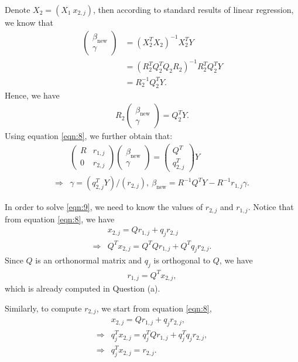 \documentclass[12pt]{article}
\newcommand{\bet}{\beta}
\newcommand{\betln}[1]{\bet_{#1}}
\begin{document}
Denote $X_2 = (X_1~x_{2,j} )$, then according to standard results of linear regression, we know that
 \begin{align*}
 	 \left( \begin{array}{cc}  \betln{\text{new}} \\
 		\gamma \end{array} \right) &= (X_2^TX_2)^{-1}X_2^TY\\
 		& = (R_2^TQ_2^TQ_2R_2)^{-1}R_2^TQ_2^TY\\
 		& = R_2^{-1}Q_2^TY.
 \end{align*}
 Hence, we have
 \begin{align*}
 	R_2 \left( \begin{array}{cc}  \betln{\text{new}} \\
 		\gamma \end{array} \right) = Q_2^TY.
 \end{align*}
 Using equation \eqref{eqn:8}, we further obtain that:
 \begin{align}
 	& \left( \begin{array}{cc}  R&r_{1,j} \\
 		0&r_{2,j} \end{array} \right) \left( \begin{array}{cc}  \betln{\text{new}} \\
 		\gamma \end{array} \right) = \left( \begin{array}{cc}  Q^T \\
 		q_{2,j}^T \end{array} \right) Y \nonumber \\
 	\Rightarrow & \gamma  = (q_{2,j}^T Y)/(r_{2,j}), ~\betln{\text{new}} = R^{-1}Q^TY - R^{-1}r_{1,j} \gamma. \label{eqn:9}
 \end{align}
 
 In order to solve \eqref{eqn:9}, we need to know the values
 of $r_{2,j}$ and $r_{1,j}$. Notice that from equation \eqref{eqn:8}, 
 we have
 \begin{align*}
 	&x_{2,j} = Qr_{1,j} + q_{j}r_{2,j} \\
 	\Rightarrow & Q^Tx_{2,j} = Q^TQ r_{1,j} + Q^Tq_jr_{2,j}.
 \end{align*}
 Since $Q$ is an orthonormal matrix and $q_j$ is orthogonal
 to $Q$, we have
 \begin{align}
 	r_{1,j} = Q^Tx_{2,j}, \label{eqn:10}
 \end{align}  
 which is already computed in Question (a).
 
 Similarly, to compute $r_{2,j}$, we start from equation \eqref{eqn:8},
  \begin{align}
 	&x_{2,j} = Qr_{1,j} + q_{j}r_{2,j}, \nonumber\\
 	\Rightarrow & q_j^Tx_{2,j} = q_j^TQ r_{1,j} + q_j^Tq_jr_{2,j},\nonumber\\
 	\Rightarrow & q_j^Tx_{2,j} = r_{2,j}. \label{eqn:11}
 \end{align}
\end{document}
